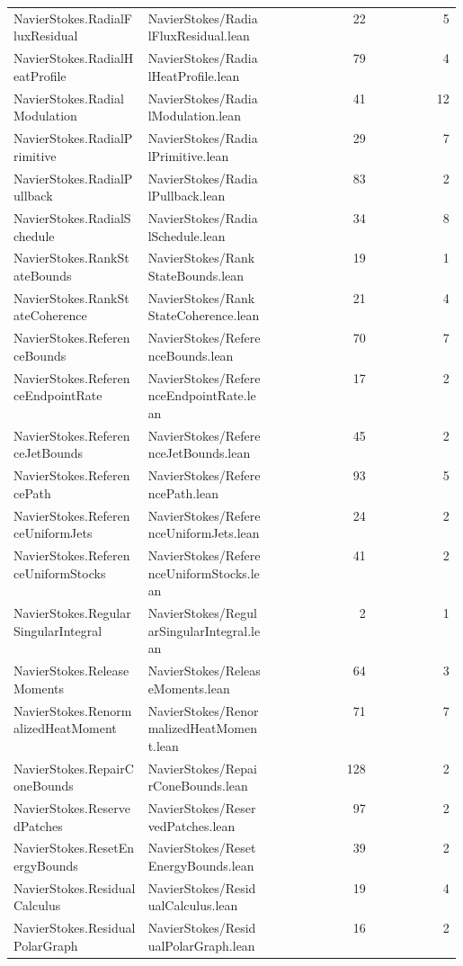 \begin{longtable}{p{0.30\linewidth}p{0.28\linewidth}rr}
NavierStokes.RadialFluxResidual & NavierStokes/RadialFluxResidual.lean & 22 & 5\\
NavierStokes.RadialHeatProfile & NavierStokes/RadialHeatProfile.lean & 79 & 4\\
NavierStokes.RadialModulation & NavierStokes/RadialModulation.lean & 41 & 12\\
NavierStokes.RadialPrimitive & NavierStokes/RadialPrimitive.lean & 29 & 7\\
NavierStokes.RadialPullback & NavierStokes/RadialPullback.lean & 83 & 2\\
NavierStokes.RadialSchedule & NavierStokes/RadialSchedule.lean & 34 & 8\\
NavierStokes.RankStateBounds & NavierStokes/RankStateBounds.lean & 19 & 1\\
NavierStokes.RankStateCoherence & NavierStokes/RankStateCoherence.lean & 21 & 4\\
NavierStokes.ReferenceBounds & NavierStokes/ReferenceBounds.lean & 70 & 7\\
NavierStokes.ReferenceEndpointRate & NavierStokes/ReferenceEndpointRate.lean & 17 & 2\\
NavierStokes.ReferenceJetBounds & NavierStokes/ReferenceJetBounds.lean & 45 & 2\\
NavierStokes.ReferencePath & NavierStokes/ReferencePath.lean & 93 & 5\\
NavierStokes.ReferenceUniformJets & NavierStokes/ReferenceUniformJets.lean & 24 & 2\\
NavierStokes.ReferenceUniformStocks & NavierStokes/ReferenceUniformStocks.lean & 41 & 2\\
NavierStokes.RegularSingularIntegral & NavierStokes/RegularSingularIntegral.lean & 2 & 1\\
NavierStokes.ReleaseMoments & NavierStokes/ReleaseMoments.lean & 64 & 3\\
NavierStokes.RenormalizedHeatMoment & NavierStokes/RenormalizedHeatMoment.lean & 71 & 7\\
NavierStokes.RepairConeBounds & NavierStokes/RepairConeBounds.lean & 128 & 2\\
NavierStokes.ReservedPatches & NavierStokes/ReservedPatches.lean & 97 & 2\\
NavierStokes.ResetEnergyBounds & NavierStokes/ResetEnergyBounds.lean & 39 & 2\\
NavierStokes.ResidualCalculus & NavierStokes/ResidualCalculus.lean & 19 & 4\\
NavierStokes.ResidualPolarGraph & NavierStokes/ResidualPolarGraph.lean & 16 & 2\\

\end{longtable}
